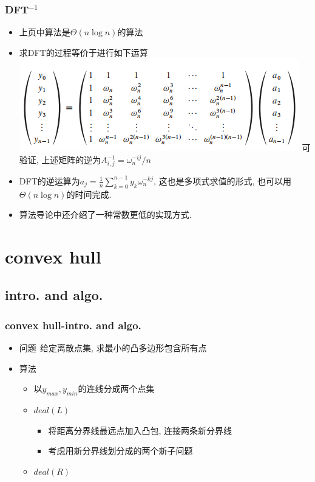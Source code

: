 \documentclass[cjk]{beamer}
\begin{document}
\begin{CJK*}{UTF8}{gbsn}
    \begin{frame}
      \frametitle{DFT$^{-1}$}
      \begin{itemize}
        \item 上页中算法是$\Theta(n\log n)$的算法
        \item 求DFT的过程等价于进行如下运算
          \newline
          \includegraphics[scale = 0.6]{2.png}
          \newline
          可验证, 上述矩阵的逆为$A^{-1}_{i, j} = {\omega_n^{-ij} / n}$
        \item DFT的逆运算为$a_j = \frac{1}{n}\sum\limits_{k = 0}^{n - 1}y_k\omega_n^{-kj}$, 这也是多项式求值的形式, 也可以用$\Theta(n\log n)$的时间完成.
        \item 算法导论中还介绍了一种常数更低的实现方式.
      \end{itemize}
    \end{frame}

\section{convex hull}
  \subsection{intro. and algo.}
    \begin{frame}
      \frametitle{convex hull-intro. and algo.}
      \begin{itemize}
        \item 问题$\ \ $给定离散点集, 求最小的凸多边形包含所有点
        \pause \item 算法
          \begin{itemize}
            \item 以$y_{max}, y_{min}$的连线分成两个点集
            \item $deal(L)$
              \begin{itemize}
                \item 将距离分界线最远点加入凸包, 连接两条新分界线
                \item 考虑用新分界线划分成的两个新子问题
              \end{itemize}
            \item $deal(R)$
          \end{itemize}
      \end{itemize}
    \end{frame}


\end{CJK*}
\end{document}
